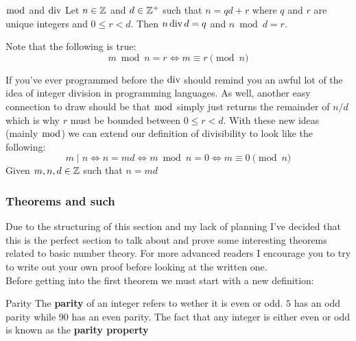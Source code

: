 \begin{definition}{$\bmod$ and $\operatorname{div}$}{}
    Let $n \in \mathbb Z$ and $d \in \mathbb Z^{+}$ such that $n = qd + r$ where $q$ and $r$ are unique integers and $0 \leq r < d$. Then $n \operatorname{div} d = q$ and $n \bmod d = r$.
\end{definition}

\begin{note}{}{}
    Note that the following is true:
    \begin{equation*}
        m \bmod n = r \Leftrightarrow m \equiv r \pmod{n}
    \end{equation*}
\end{note}

If you've ever programmed before the $\operatorname{div}$ should remind you an awful lot of the idea of integer division in programming languages. As well, another easy connection to draw should be that $\bmod$ simply just returns the remainder of $n/d$ which is why $r$ must be bounded between $0 \leq r < d$. With these new ideas (mainly $\bmod$) we can extend our definition of divisibility to look like the following:
\begin{equation*}
    m \mid n \Leftrightarrow n = md \Leftrightarrow m \bmod n = 0 \Leftrightarrow m \equiv 0 \pmod{n}
\end{equation*}
Given $m, n, d \in \mathbb Z$ such that $n = md$

\subsubsection{Theorems and such}
Due to the structuring of this section and my lack of planning I've decided that this is the perfect section to talk about and prove some interesting theorems related to basic number theory. For more advanced readers I encourage you to try to write out your own proof before looking at the written one. \\
Before getting into the first theorem we must start with a new definition:
\begin{definition}{Parity}{}
    The \textbf{parity} of an integer refers to wether it is even or odd. $5$ has an odd parity while $90$ has an even parity.
    The fact that any integer is either even or odd is known as the \textbf{parity property}
\end{definition}

